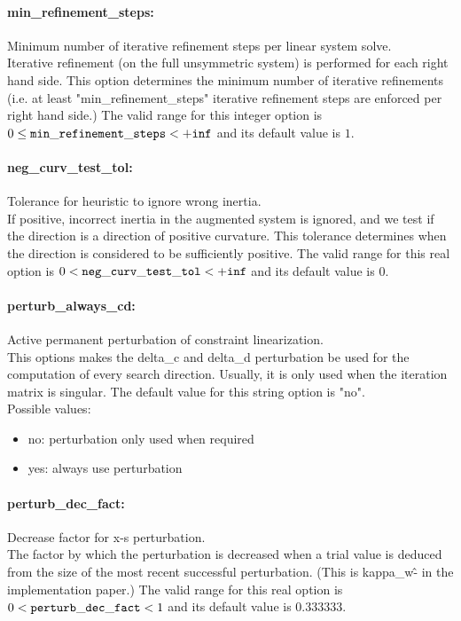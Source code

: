 \paragraph{min\_refinement\_steps:}\label{opt:min_refinement_steps} Minimum number of iterative refinement steps per linear system solve. \\
 Iterative refinement (on the full unsymmetric system) is performed for each right hand side.  This option determines the minimum number of iterative refinements (i.e. at least "min\_refinement\_steps" iterative refinement steps are enforced per right hand side.) The valid range for this integer option is
$0 \le {\tt min\_refinement\_steps } <  {\tt +inf}$
and its default value is $1$.


\paragraph{neg\_curv\_test\_tol:}\label{opt:neg_curv_test_tol} Tolerance for heuristic to ignore wrong inertia. \\
 If positive, incorrect inertia in the augmented system is ignored, and we test if the direction is a direction of positive curvature.  This tolerance determines when the direction is considered to be sufficiently positive. The valid range for this real option is 
$0 <  {\tt neg\_curv\_test\_tol } <  {\tt +inf}$
and its default value is $0$.


\paragraph{perturb\_always\_cd:}\label{opt:perturb_always_cd} Active permanent perturbation of constraint linearization. \\
 This options makes the delta\_c and delta\_d perturbation be used for the computation of every search direction.  Usually, it is only used when the iteration matrix is singular. The default value for this string option is "no".
\\ 
Possible values:
\begin{itemize}
   \item no: perturbation only used when required
   \item yes: always use perturbation
\end{itemize}

\paragraph{perturb\_dec\_fact:}\label{opt:perturb_dec_fact} Decrease factor for x-s perturbation. \\
 The factor by which the perturbation is decreased when a trial value is deduced from the size of the most recent successful perturbation. (This is kappa\_w\^- in the implementation paper.) The valid range for this real option is 
$0 <  {\tt perturb\_dec\_fact } <  1$
and its default value is $0.333333$.


